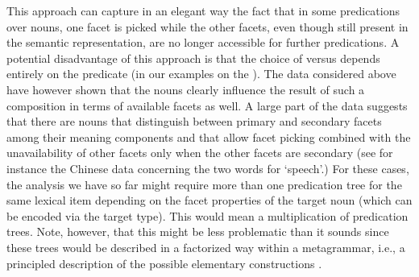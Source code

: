 \documentclass[output=paper,colorlinks,citecolor=brown,chinesefont]{langscibook}
\begin{document}
This approach can capture in an elegant way the fact that in some predications over  nouns, one facet is picked while the other facets, even though still present in the semantic representation, are no longer accessible for further predications. A potential disadvantage of this approach is that the choice of  versus  depends entirely on the predicate (in our examples on the ). The data considered above have however shown that the  nouns clearly influence the result of such a composition in terms of available facets as well.  A large part of the data suggests that there are  nouns that distinguish between primary and secondary facets among their meaning components and that allow facet picking combined with the unavailability of other facets only when the other facets are secondary (see for instance the Chinese data concerning the two words for `speech'.) For these cases, the analysis we have so far might require more than one predication tree for the same lexical item depending on the facet properties of the target noun (which can be encoded via the target type). This would mean a multiplication of predication trees. Note, however, that this might be less problematic than it sounds since these trees would be described in a factorized way within a metagrammar, i.e., a principled description of the possible elementary constructions \citep{Crabbe/etal:2013,kallmeyer2013syntax,Lichte/Petitjean:2015}.


\end{document}
